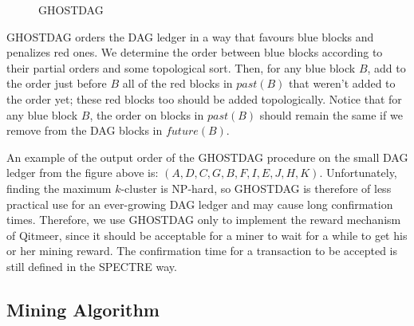\documentclass[a4paper,11pt]{article}
\begin{document}
\begin{figure}[ht]
	\centerline{%
	}
\caption{GHOSTDAG}
\end{figure}


GHOSTDAG orders the DAG ledger in a way that favours blue blocks and penalizes
red ones. We determine the order between blue blocks according to their partial
orders and some topological sort. Then, for any blue block $B$, add to the order
just before $B$ all of the red blocks in $past(B)$ that weren’t added to the
order yet; these red blocks too should be added topologically. Notice
that for any blue block $B$, the order on blocks in $past(B)$ should remain the
same if we remove from the DAG blocks in $future(B)$. 

An example of the output order of the GHOSTDAG procedure on the small DAG ledger
from the figure above is: $(A,D,C,G,B,F,I,E,J,H,K)$. Unfortunately, finding the
maximum $k$-cluster is NP-hard, so GHOSTDAG is therefore of less practical use
for an ever-growing DAG ledger and may cause long confirmation times.
Therefore, we use GHOSTDAG only to implement the reward mechanism of Qitmeer, since
it should be acceptable for a miner to wait for a while to get his or her mining
reward. The confirmation time for a transaction to be accepted is still defined
in the SPECTRE way.

\subsection{Mining Algorithm}
\end{document}
